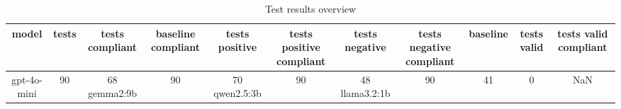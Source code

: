 
  \begin{table}[h!]
  \centering
  \begin{tabular}{|c|c|c|c|c|c|c|c|c|c|c|}
  \hline
  model & tests & tests compliant & baseline compliant & tests positive & tests positive compliant & tests negative & tests negative compliant & baseline & tests valid & tests valid compliant \\
  \hline
  gpt-4o-mini & 90 & 68%
\hline
gemma2:9b & 90 & 70%
\hline
qwen2.5:3b & 90 & 48%
\hline
llama3.2:1b & 90 & 41%
\hline
 & 0 & NaN%
  \end{tabular}
  \caption{Test results overview}
  
  \end{table}
  